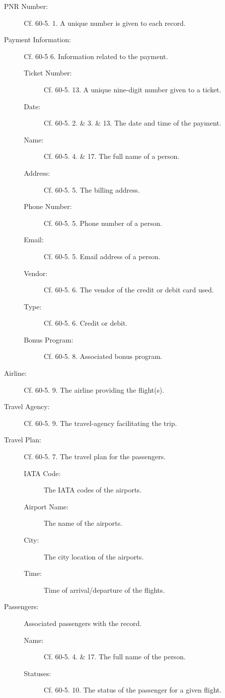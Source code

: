 \begin{description}
    \item[PNR Number:] Cf. 60-5. 1. A unique number is given to each record.
    \item[Payment Information:] Cf. 60-5 6. Information related to the payment.
    \begin{description}
        \item[Ticket Number:] Cf. 60-5. 13. A unique nine-digit number given to a ticket.
        \item[Date:] Cf. 60-5. 2. \& 3. \& 13. The date and time of the payment.
        \item[Name:] Cf. 60-5. 4. \& 17. The full name of a person.
        \item[Address:] Cf. 60-5. 5. The billing address.
        \item[Phone Number:] Cf. 60-5. 5. Phone number of a person.
        \item[Email:] Cf. 60-5. 5. Email address of a person.
        \item[Vendor:] Cf. 60-5. 6. The vendor of the credit or debit card used.
        \item[Type:] Cf. 60-5. 6. Credit or debit.
        \item[Bonus Program:] Cf. 60-5. 8. Associated bonus program.
    \end{description}
    \item[Airline:] Cf. 60-5. 9. The airline providing the flight(s).
    \item[Travel Agency:] Cf. 60-5. 9. The travel-agency facilitating the trip.
    \item[Travel Plan:] Cf. 60-5. 7. The travel plan for the passengers.
    \begin{description}
        \item[IATA Code:] The IATA codes of the airports.
        \item[Airport Name:] The name of the airports.
        \item[City:] The city location of the airports.
        \item[Time:] Time of arrival/departure of the flights.
    \end{description}
    \item[Passengers:] Associated passengers with the record.
    \begin{description}
        \item[Name:] Cf. 60-5. 4. \& 17. The full name of the person.
        \item[Statuses:] Cf. 60-5. 10. The status of the passenger for a given flight. 

\end{description}
\end{description}
